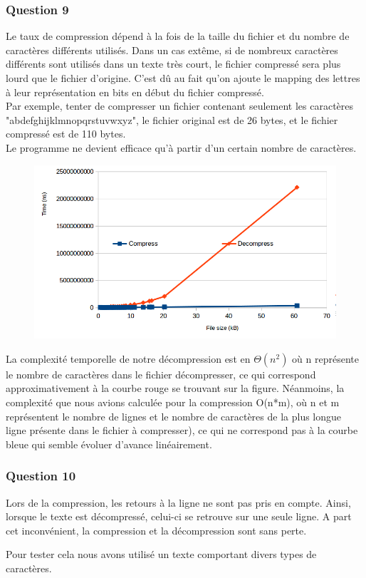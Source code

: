 \documentclass[a4paper]{article}
\begin{document}
\subsubsection*{Question 9}
Le taux de compression dépend à la fois de la taille du fichier et du nombre de caractères différents utilisés. Dans un cas extême, si de nombreux caractères différents sont utilisés dans un texte très court, le fichier compressé sera plus lourd que le fichier d'origine. C'est dû au fait qu'on ajoute le mapping des lettres à leur représentation en bits en début du fichier compressé.\\

Par exemple, tenter de compresser un fichier contenant seulement les caractères "abdefghijklmnopqrstuvwxyz", le fichier original est de 26 bytes, et le fichier compressé est de 110 bytes. 
\\
Le programme ne devient efficace qu'à partir d'un certain nombre de caractères. 
\\

\begin{figure}[b]
   \includegraphics[scale=0.4]{graph.png}
\end{figure}

La complexité temporelle de notre décompression est en $\Theta(n^2)$ où n représente le nombre de caractères dans le fichier décompresser, ce qui correspond approximativement à la courbe rouge se trouvant sur la figure. Néanmoins, la complexité que nous avions calculée pour la compression O(n*m), où n et m représentent le nombre de lignes et le nombre de caractères de la plus longue ligne présente dans le fichier à compresser), ce qui ne correspond pas à la courbe bleue qui semble évoluer d'avance linéairement. 
\subsubsection*{Question 10}
Lors de la compression, les retours à la ligne ne sont pas pris en compte. Ainsi, lorsque le texte est décompressé, celui-ci se retrouve sur une seule ligne. A part cet inconvénient, la compression et la décompression sont sans perte. 

Pour tester cela nous avons utilisé un texte comportant divers types de caractères. 
\end{document}
